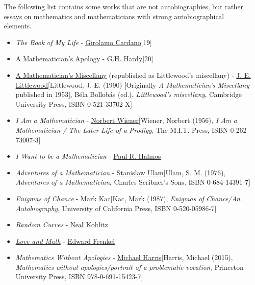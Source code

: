 \documentclass{book}
\numberwithin{equation}{section}
\begin{document}
The following list contains some works that are not autobiographies, but rather essays on mathematics and mathematicians with strong autobiographical elements.
\begin{itemize}
    \item \textit{The Book of My Life} - \href{https://en.wikipedia.org/wiki/Girolamo_Cardano}{Girolamo Cardano}[19]
    \item \href{https://en.wikipedia.org/wiki/A_Mathematician's_Apology}{A Mathematician's Apology} - \href{https://en.wikipedia.org/wiki/G.H._Hardy}{G.H. Hardy}[20]
    \item \href{https://en.wikipedia.org/wiki/A_Mathematician's_Miscellany}{A Mathematician's Miscellany} (republished as Littlewood's miscellany) - \href{https://en.wikipedia.org/wiki/J._E._Littlewood}{J. E. Littlewood}[Littlewood, J. E. (1990) [Originally \textit{A Mathematician's Miscellany} published in 1953], Béla Bollobás (ed.), \textit{Littlewood's miscellany}, Cambridge University Press, ISBN 0-521-33702 X]
    \item \textit{I Am a Mathematician} - \href{https://en.wikipedia.org/wiki/Norbert_Wiener}{Norbert Wiener}[Wiener, Norbert (1956), \textit{I Am a Mathematician / The Later Life of a Prodigy}, The M.I.T. Press, ISBN 0-262-73007-3]
    \item \textit{I Want to be a Mathematician} - \href{https://en.wikipedia.org/wiki/Paul_R._Halmos}{Paul R. Halmos}
    \item \textit{Adventures of a Mathematician} - \href{https://en.wikipedia.org/wiki/Stanislaw_Ulam}{Stanislaw Ulam}[Ulam, S. M. (1976), \textit{Adventures of a Mathematician}, Charles Scribner's Sons, ISBN 0-684-14391-7]
    \item \textit{Enigmas of Chance} - \href{https://en.wikipedia.org/wiki/Mark_Kac}{Mark Kac}[Kac, Mark (1987), \textit{Enigmas of Chance/An Autobiography}, University of California Press, ISBN 0-520-05986-7]
    \item \textit{Random Curves} - \href{https://en.wikipedia.org/wiki/Neal_Koblitz}{Neal Koblitz}
    \item \href{https://en.wikipedia.org/wiki/Edward_Frenkel#Love_and_Math}{\textit{Love and Math}} - \href{https://en.wikipedia.org/wiki/Edward_Frenkel}{Edward Frenkel}
    \item \textit{Mathematics Without Apologies} - \href{https://en.wikipedia.org/wiki/Michael_Harris_(mathematician)}{Michael Harris}[Harris, Michael (2015), \textit{Mathematics without apologies/portrait of a problematic vocation}, Princeton University Press, ISBN 978-0-691-15423-7]
\end{itemize}
\end{document}
